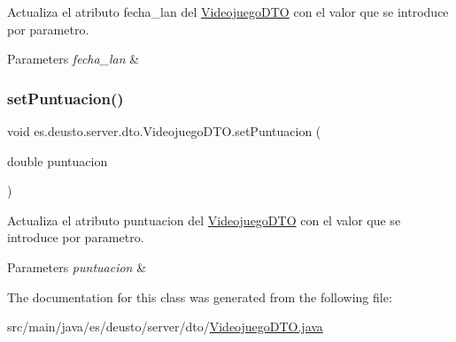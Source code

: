 Actualiza el atributo fecha\+\_\+lan del \mbox{\hyperlink{classes_1_1deusto_1_1server_1_1dto_1_1_videojuego_d_t_o}{Videojuego\+D\+TO}} con el valor que se introduce por parametro. 
\begin{DoxyParams}{Parameters}
{\em fecha\+\_\+lan} & \\
\hline
\end{DoxyParams}
\mbox{\label{classes_1_1deusto_1_1server_1_1dto_1_1_videojuego_d_t_o_a2ac10b3f4b30b36da2a352797c70c854}} 
\subsubsection{\texorpdfstring{setPuntuacion()}{setPuntuacion()}}
{\footnotesize\ttfamily void es.\+deusto.\+server.\+dto.\+Videojuego\+D\+T\+O.\+set\+Puntuacion (\begin{DoxyParamCaption}\item[{double}]{puntuacion }\end{DoxyParamCaption})}

Actualiza el atributo puntuacion del \mbox{\hyperlink{classes_1_1deusto_1_1server_1_1dto_1_1_videojuego_d_t_o}{Videojuego\+D\+TO}} con el valor que se introduce por parametro. 
\begin{DoxyParams}{Parameters}
{\em puntuacion} & \\
\hline
\end{DoxyParams}


The documentation for this class was generated from the following file\+:\begin{DoxyCompactItemize}
\item 
src/main/java/es/deusto/server/dto/\mbox{\hyperlink{_videojuego_d_t_o_8java}{Videojuego\+D\+T\+O.\+java}}\end{DoxyCompactItemize}

